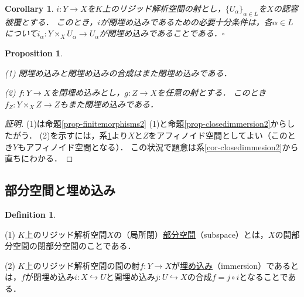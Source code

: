\documentclass[a4paper,12pt, dvipdfmx]{jsbook}
\theoremstyle{plain}
\newtheorem{prop}[thm]{\bfseries Proposition}
\newtheorem{cor}[thm]{\bfseries Corollary}
\theoremstyle{definition}
\newtheorem{dfn}[thm]{\bfseries Definition}
\begin{document}
\begin{cor}\label{cor-closedimmesion3}{\rm 
$i\colon Y\rightarrow X$を$K$上のリジッド解析空間の射とし，$\{U_{\alpha}\}_{\alpha\in L}$を$X$の認容被覆とする．
このとき，$i$が閉埋め込みであるための必要十分条件は，各$\alpha\in L$について$i_{\alpha}\colon Y\times_XU_{\alpha}\rightarrow U_{\alpha}$が閉埋め込みであることである．}\hfill$\square$
\end{cor}

\begin{prop}\label{prop-closedimmersion3}{\rm 
(1) 閉埋め込みと閉埋め込みの合成はまた閉埋め込みである．

(2) $f\colon Y\rightarrow X$を閉埋め込みとし，$g\colon Z\rightarrow X$を任意の射とする．
このとき$f_Z\colon Y\times_XZ\rightarrow Z$もまた閉埋め込みである．}
\end{prop}

\begin{proof}[証明]
(1)は命題\ref{prop-finitemorphisms2} (1)と命題\ref{prop-closedimmersion2}からしたがう．
(2)を示すには，系\ref{cor-closedimmesion3}より$X$と$Z$をアフィノイド空間としてよい（このとき$Y$もアフィノイド空間となる）．
この状況で題意は系\ref{cor-closedimmesion2}から直ちにわかる．
\end{proof}

\subsection{部分空間と埋め込み}\label{sub-immersions}
\begin{dfn}\label{dfn-immersions}{\rm 
(1) $K$上のリジッド解析空間$X$の（局所閉）\underline{部分空間}（subspace）とは，$X$の開部分空間の閉部分空間のことである．

(2) $K$上のリジッド解析空間の間の射$f\colon Y\rightarrow X$が\underline{埋め込み}（immersion）であるとは，$f$が閉埋め込み$i\colon X\hookrightarrow U$と開埋め込み$j\colon U\hookrightarrow X$の合成$f=j\circ i$となることである．}
\end{dfn}
\end{document}
